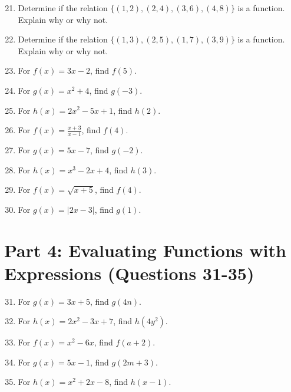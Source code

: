 \documentclass[12pt]{article}
\begin{document}
\begin{enumerate}
\setcounter{enumi}{20}

\item Determine if the relation $\{(1, 2), (2, 4), (3, 6), (4, 8)\}$ is a function. Explain why or why not.

\item Determine if the relation $\{(1, 3), (2, 5), (1, 7), (3, 9)\}$ is a function. Explain why or why not.

\item For $f(x) = 3x - 2$, find $f(5)$.

\item For $g(x) = x^2 + 4$, find $g(-3)$.

\item For $h(x) = 2x^2 - 5x + 1$, find $h(2)$.

\item For $f(x) = \frac{x+3}{x-1}$, find $f(4)$.

\item For $g(x) = 5x - 7$, find $g(-2)$.

\item For $h(x) = x^3 - 2x + 4$, find $h(3)$.

\item For $f(x) = \sqrt{x + 5}$, find $f(4)$.

\item For $g(x) = |2x - 3|$, find $g(1)$.

\end{enumerate}

\section*{Part 4: Evaluating Functions with Expressions (Questions 31-35)}

\begin{enumerate}
\setcounter{enumi}{30}

\item For $g(x) = 3x + 5$, find $g(4n)$.

\item For $h(x) = 2x^2 - 3x + 7$, find $h(4y^2)$.

\item For $f(x) = x^2 - 6x$, find $f(a+2)$.

\item For $g(x) = 5x - 1$, find $g(2m + 3)$.

\item For $h(x) = x^2 + 2x - 8$, find $h(x-1)$.

\end{enumerate}
\end{document}
